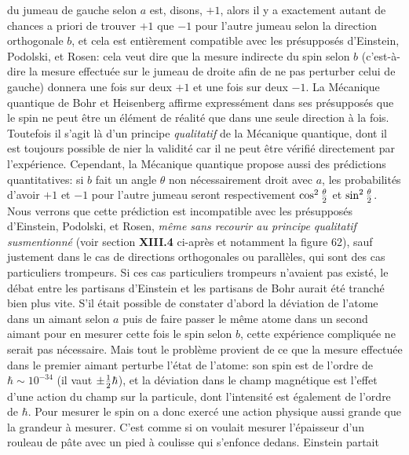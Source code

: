 du jumeau de gauche selon $a$ est, disons, $+1$, alors il y a
exactement autant de chances a priori de trouver $+1$ que
$-1$ pour l'autre jumeau selon la direction orthogonale $b$, 
et cela est enti\`erement compatible avec les pr\'esuppos\'es
d'Einstein,  Podolski,  et Rosen:  cela veut dire que la mesure
indirecte du spin selon $b$ (c'est-\`a-dire la mesure effectu\'ee
sur le jumeau de droite afin de ne pas perturber celui de gauche)
donnera une fois sur deux $+1$ et une fois sur deux $-1$. 
\medskip
La M\'ecanique quantique de Bohr et Heisenberg affirme express\'ement
dans ses pr\'esuppos\'es que le spin ne peut \^etre un \'el\'ement de
r\'ealit\'e que dans une seule direction \`a la fois.  Toutefois
il s'agit l\`a d'un principe {\it qualitatif} de la M\'ecanique
quantique,  dont il est toujours possible de nier la validit\'e
car il ne peut \^etre v\'erifi\'e directement par l'exp\'erience. 
Cependant,  la M\'ecanique quantique propose aussi des pr\'edictions
quantitatives:  si $b$ fait un angle $\theta$ non n\'ecessairement
droit avec $a$,  les probabilit\'es  d'avoir $+1$ et $-1$ pour
l'autre jumeau seront respectivement $\cos^2{\theta \over 2}$ et
$\sin^2{\theta \over 2}$.  Nous verrons que cette pr\'ediction est
incompatible avec les pr\'esuppos\'es d'Einstein,  Podolski, 
et Rosen,  {\it m\^eme sans recourir au principe qualitatif
susmentionn\'e} (voir section {\bf XIII.4} ci-apr\`es et notamment la
figure 62),  sauf justement dans le cas de directions orthogonales
ou parall\`eles,  qui sont des cas particuliers trompeurs.  Si ces
cas particuliers trompeurs n'avaient pas exist\'e,  le d\'ebat entre
les {\og partisans d'Einstein\fg} et les {\og partisans de Bohr\fg}
aurait \'et\'e tranch\'e bien plus vite. 
\medskip 
S'il \'etait possible de constater d'abord la d\'eviation de l'atome dans  
un aimant selon $a$ puis de faire passer le m\^eme atome dans un second 
aimant pour en mesurer cette fois le spin selon $b$, cette 
exp\'erience compliqu\'ee ne serait pas n\'ecessaire. Mais tout le  
probl\`eme  provient de ce que la mesure effectu\'ee dans le premier 
aimant perturbe l'\'etat de l'atome: son spin est de l'ordre de $\hbar  
\sim 10^{-34}$ (il vaut $\pm {1\over 2}\hbar$), et la d\'eviation dans le 
champ magn\'etique est l'effet d'une action du champ sur la particule, 
dont l'intensit\'e est \'egalement de l'ordre de $\hbar$. Pour mesurer le 
spin on a donc exerc\'e une action physique aussi grande que la grandeur 
\`a mesurer. C'est comme si on voulait mesurer l'\'epaisseur d'un rouleau 
de p\^ate avec un pied \`a coulisse qui s'enfonce dedans. Einstein partait 
